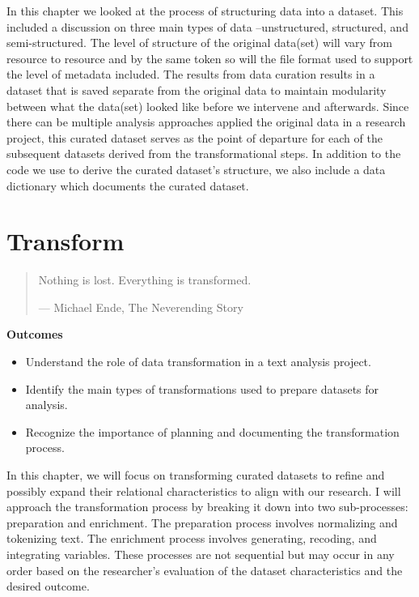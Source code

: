 \documentclass[
  letterpaper,
]{latex/krantz}
\providecommand{\tightlist}{%
  \setlength{\itemsep}{0pt}\setlength{\parskip}{0pt}}\usepackage{longtable,booktabs,array}
\theoremstyle{definition}
\theoremstyle{remark}
\begin{document}

In this chapter we looked at the process of structuring data into a
dataset. This included a discussion on three main types of data
--unstructured, structured, and semi-structured. The level of structure
of the original data(set) will vary from resource to resource and by the
same token so will the file format used to support the level of metadata
included. The results from data curation results in a dataset that is
saved separate from the original data to maintain modularity between
what the data(set) looked like before we intervene and afterwards. Since
there can be multiple analysis approaches applied the original data in a
research project, this curated dataset serves as the point of departure
for each of the subsequent datasets derived from the transformational
steps. In addition to the code we use to derive the curated dataset's
structure, we also include a data dictionary which documents the curated
dataset.

\chapter{Transform}\label{sec-transform-chapter}

\begin{quote}
Nothing is lost. Everything is transformed.

--- Michael Ende, The Neverending Story
\end{quote}

\begin{tcolorbox}[enhanced jigsaw, colback=white, opacityback=0, bottomrule=.15mm, rightrule=.15mm, breakable, left=2mm, arc=.35mm, colframe=quarto-callout-color-frame, leftrule=.75mm, toprule=.15mm]

\textbf{ Outcomes}

\begin{itemize}
\tightlist
\item
  Understand the role of data transformation in a text analysis project.
\item
  Identify the main types of transformations used to prepare datasets
  for analysis.
\item
  Recognize the importance of planning and documenting the
  transformation process.
\end{itemize}

\end{tcolorbox}

In this chapter, we will focus on transforming curated datasets to
refine and possibly expand their relational characteristics to align
with our research. I will approach the transformation process by
breaking it down into two sub-processes: preparation and enrichment. The
preparation process involves normalizing and tokenizing text. The
enrichment process involves generating, recoding, and integrating
variables. These processes are not sequential but may occur in any order
based on the researcher's evaluation of the dataset characteristics and
the desired outcome.
\end{document}
